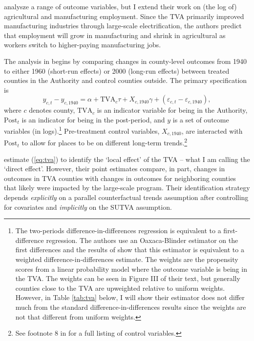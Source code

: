 \documentclass[11pt]{article}
\begin{document}
\citet{Kline_Moretti_2014} analysze a range of outcome variables, but I extend their work on (the log of) agricultural and manufacturing employment. Since the TVA primarily improved manufacturing industries through large-scale electrification, the authors predict that employment will grow in manufacturing and shrink in agricultural as workers switch to higher-paying manufacturing jobs. 

The analysis in \citet{Kline_Moretti_2014} begins by comparing changes in county-level outcomes from 1940 to either 1960 (short-run effects) or 2000 (long-run effects) between treated counties in the Authority and control counties outside. The primary specification is
\begin{equation}\label{eq:tva}
    y_{c, t} - y_{c, 1940} = \alpha + \text{TVA}_c \tau + X_{c, 1940} \gamma + (\varepsilon_{c, t} - \varepsilon_{c, 1940}),
\end{equation}
where $c$ denotes county, $\text{TVA}_c$ is an indicator variable for being in the Authority, $\text{Post}_t$ is an indicator for being in the post-period, and $y$ is a set of outcome variables (in logs).\footnote{The two-periods difference-in-differences regression is equivalent to a first-difference regression. The authors use an Oaxaca-Blinder estimator on the first differences and the results of \citet{Kline_2011} show that this estimator is equivalent to a weighted difference-in-differences estimate. The weights are the propensity scores from a linear probability model where the outcome variable is being in the TVA. The weights can be seen in Figure III of their text, but generally counties close to the TVA are upweighted relative to uniform weights. However, in Table \ref{tab:tva} below, I will show their estimator does not differ much from the standard difference-in-differences results since the weights are not that different from uniform weights.} Pre-treatment control variables, $X_{c,1940}$, are interacted with $\text{Post}_t$ to allow for places to be on different long-term trends.\footnote{See footnote 8 in \citet{Kline_Moretti_2014} for a full listing of control variables.} 

\citet{Kline_Moretti_2014} estimate (\ref{eq:tva}) to identify the `local effect' of the TVA -- what I am calling the `direct effect'. However, their point estimates compare, in part, changes in outcomes in TVA counties with changes in outcomes for neighboring counties that likely were impacted by the large-scale program. Their identification strategy depends \emph{explicitly} on a parallel counterfactual trends assumption after controlling for covariates and \emph{implicitly} on the SUTVA assumption. 
\end{document}
